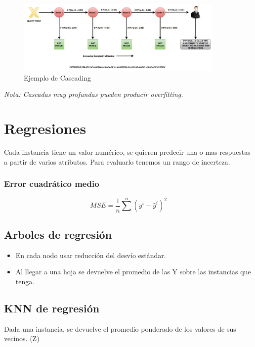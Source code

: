 \documentclass[titlepage,a4paper]{article}
\begin{document}
\begin{figure}[!htb]
    \centering
    \includegraphics[width=0.9\textwidth]{imagenesResumen/Cascading.jpeg}
    \caption{Ejemplo de Cascading}
\end{figure}


\textit{Nota: Cascadas muy profundas pueden producir overfitting.}

\section{Regresiones}

Cada instancia tiene un valor numérico, se quieren predecir una o mas respuestas a partir de varios atributos. Para evaluarlo tenemos un rango de incerteza.

\subsubsection*{Error cuadrático medio}
\begin{equation}
    MSE = \frac{1}{n} \sum^{n} (y^{i}-\hat{y}^{i})^{2}
\end{equation}

\subsection{Arboles de regresión}
\begin{itemize}
    \item En cada nodo usar reducción del desvío estándar.
    \item Al llegar a una hoja se devuelve el promedio de las Y sobre las instancias que tenga.
\end{itemize}


\subsection{KNN de regresión}
Dada una instancia, se devuelve el promedio ponderado de los valores de sus vecinos. (Z)
\end{document}
